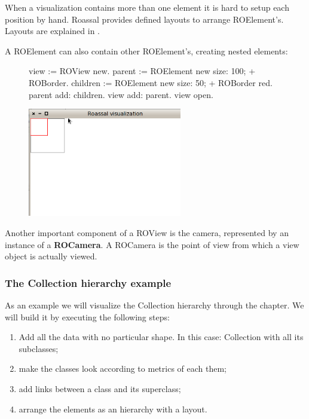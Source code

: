 \documentclass[a4paper,10pt,twoside]{book}
\begin{document}
When a visualization contains more than one element it is hard to setup each position by hand. Roassal provides defined layouts to arrange ROElement's. Layouts are explained in  .

A ROElement can also contain other ROElement's, creating nested elements:

\begin{figure}[H]
      \begin{minipage}[t]{0.5\textwidth}
      \vspace{0pt}
\begin{code}{}
view := ROView new.
parent := ROElement new 
				size: 100;
				+ ROBorder.
children := ROElement new 
				size: 50;
				+ ROBorder red.
parent add: children.
view add: parent.
view open.
\end{code}
   \end{minipage}
   \hfill
   \begin{minipage}[t]{0.6\textwidth}
      \vspace{0pt} \raggedright
       \centering
		\includegraphics[width=0.6\textwidth]{ex5}
   \end{minipage}
\label{fig:ex5}
\end{figure}

Another important component of a ROView is the camera, represented by an instance of a \textbf{ROCamera}. A ROCamera is the point of view from which a view object is actually viewed.

\subsubsection*{The Collection hierarchy example}
As an example we will visualize the Collection hierarchy through the chapter. We will build it by executing the following steps:
\begin{enumerate}
\item Add all the data with no particular shape. In this case: Collection with all its subclasses;
\item make the classes look according to metrics of each them;
\item add links between a class and its superclass;
\item arrange the elements as an hierarchy with a layout.
\end{enumerate}
\end{document}
